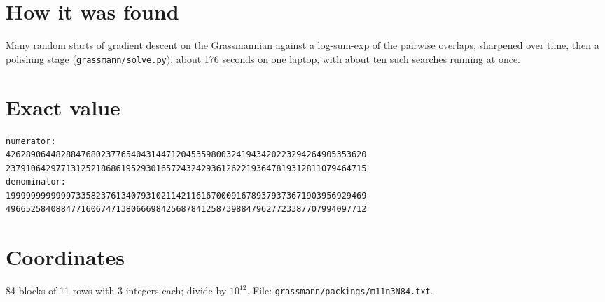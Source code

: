 \documentclass[11pt,a4paper]{article}
\begin{document}
\section{How it was found}
Many random starts of gradient descent on the Grassmannian against a log-sum-exp of the pairwise overlaps, sharpened over time, then a polishing stage (\texttt{grassmann/solve.py}); about 176 seconds on one laptop, with about ten such searches running at once.


\appendix
\section{Exact value}
{\small
\begin{verbatim}
numerator:
426289064482884768023776540431447120453598003241943420223294264905353620
237910642977131252186861952930165724324293612622193647819312811079464715
denominator:
199999999999973358237613407931021142116167000916789379373671903956929469
496652584088477160674713806669842568784125873988479627723387707994097712
\end{verbatim}}

\section{Coordinates}
84 blocks of 11 rows with 3 integers each; divide by $10^{12}$. File: \texttt{grassmann/packings/m11n3N84.txt}.
{\tiny
\begin{multicols}{3}
\end{multicols}}
\end{document}
